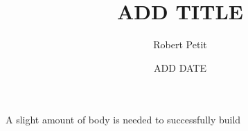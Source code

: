 \documentclass{article}
\title{ADD TITLE}
\author{Robert Petit}
\date{ADD DATE}
\begin{document}
\maketitle

A slight amount of body is needed to successfully build \cite{Petit11}





\end{document}
